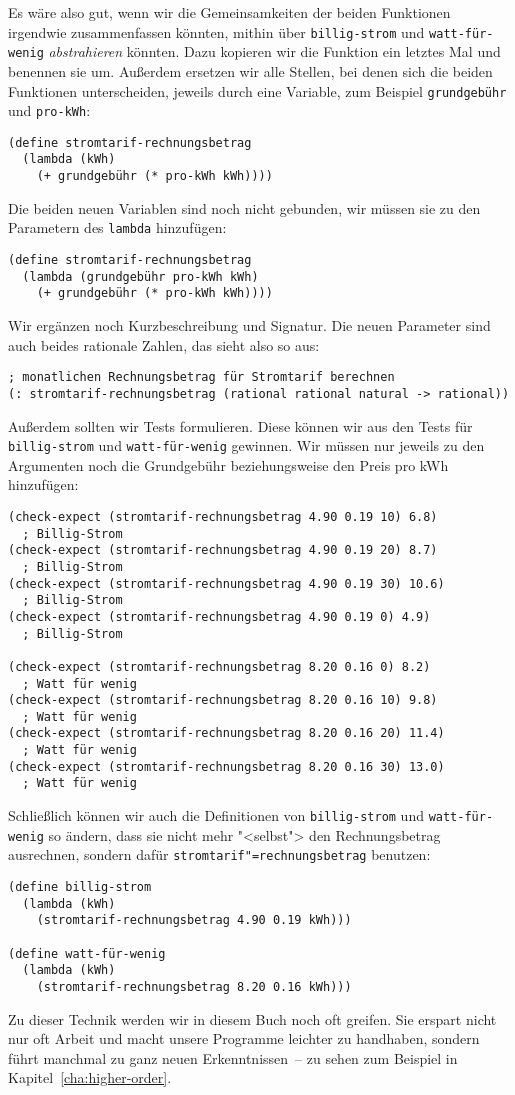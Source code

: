 Es wäre also gut, wenn wir die Gemeinsamkeiten der beiden Funktionen
irgendwie zusammenfassen könnten, mithin über \lstinline{billig-strom}
und \lstinline{watt-für-wenig} \textit{abstrahieren}
könnten.  Dazu kopieren wir die Funktion ein letztes Mal und benennen
sie um.  Außerdem ersetzen wir alle Stellen, bei denen sich die beiden
Funktionen unterscheiden, jeweils durch eine Variable, zum Beispiel
\lstinline{grundgebühr} und \lstinline{pro-kWh}:
%
\begin{lstlisting}
(define stromtarif-rechnungsbetrag
  (lambda (kWh)
    (+ grundgebühr (* pro-kWh kWh))))
\end{lstlisting}
%
Die beiden neuen Variablen sind noch nicht gebunden, wir müssen sie zu
den Parametern des \lstinline{lambda} hinzufügen:
%
\begin{lstlisting}
(define stromtarif-rechnungsbetrag
  (lambda (grundgebühr pro-kWh kWh)
    (+ grundgebühr (* pro-kWh kWh))))
\end{lstlisting}
%
Wir ergänzen noch Kurzbeschreibung und Signatur.  Die neuen Parameter
sind auch beides rationale Zahlen, das sieht also so aus:
%
\begin{lstlisting}
; monatlichen Rechnungsbetrag für Stromtarif berechnen
(: stromtarif-rechnungsbetrag (rational rational natural -> rational))
\end{lstlisting}
%
Außerdem sollten wir Tests formulieren.  Diese können wir aus den
Tests für \lstinline{billig-strom} und \lstinline{watt-für-wenig} gewinnen.
Wir müssen nur jeweils zu den Argumenten noch die Grundgebühr
beziehungsweise den Preis pro kWh hinzufügen:
%
\begin{lstlisting}
(check-expect (stromtarif-rechnungsbetrag 4.90 0.19 10) 6.8)  
  ; Billig-Strom
(check-expect (stromtarif-rechnungsbetrag 4.90 0.19 20) 8.7)  
  ; Billig-Strom
(check-expect (stromtarif-rechnungsbetrag 4.90 0.19 30) 10.6) 
  ; Billig-Strom
(check-expect (stromtarif-rechnungsbetrag 4.90 0.19 0) 4.9)
  ; Billig-Strom

(check-expect (stromtarif-rechnungsbetrag 8.20 0.16 0) 8.2)
  ; Watt für wenig
(check-expect (stromtarif-rechnungsbetrag 8.20 0.16 10) 9.8)
  ; Watt für wenig
(check-expect (stromtarif-rechnungsbetrag 8.20 0.16 20) 11.4)
  ; Watt für wenig
(check-expect (stromtarif-rechnungsbetrag 8.20 0.16 30) 13.0)
  ; Watt für wenig
\end{lstlisting}
%
Schließlich können wir auch die Definitionen von \lstinline{billig-strom}
und \lstinline{watt-für-wenig} so ändern, dass sie nicht mehr "<selbst">
den Rechnungsbetrag ausrechnen, sondern dafür
\lstinline{stromtarif"=rechnungsbetrag} benutzen:
%
\begin{lstlisting}
(define billig-strom
  (lambda (kWh)
    (stromtarif-rechnungsbetrag 4.90 0.19 kWh)))

(define watt-für-wenig
  (lambda (kWh)
    (stromtarif-rechnungsbetrag 8.20 0.16 kWh)))
\end{lstlisting}
%
Zu dieser Technik werden wir in diesem Buch noch oft greifen.  Sie
erspart nicht nur oft Arbeit und macht unsere Programme leichter zu
handhaben, sondern führt manchmal zu ganz neuen Erkenntnissen~--
zu sehen zum Beispiel in Kapitel~\ref{cha:higher-order}.

